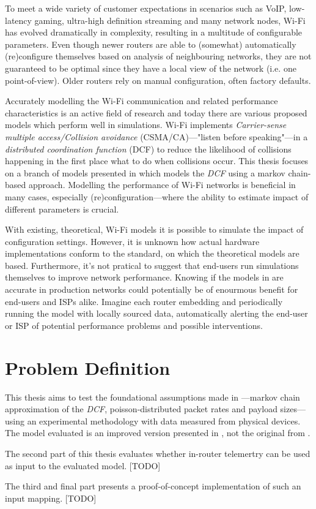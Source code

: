 To meet a wide variety of customer expectations in scenarios such as VoIP,
low-latency gaming, ultra-high definition streaming and many network nodes,
Wi-Fi has evolved dramatically in complexity, resulting in a multitude of
configurable parameters. Even though newer routers are able to (somewhat)
automatically (re)configure themselves based on analysis of neighbouring
networks, they are not guaranteed to be optimal since they have a local view
of the network (i.e. one point-of-view). Older routers rely on manual
configuration, often factory defaults. 

Accurately modelling the Wi-Fi communication and related performance
characteristics is an active field of research and today there are various
proposed models which perform well in simulations. Wi-Fi implements
\emph{Carrier-sense multiple access/Collision avoidance} (CSMA/CA)—"listen
before speaking"—in a \emph{distributed coordination function} (DCF) to reduce
the likelihood of collisions happening in the first place what to do when
collisions occur.  This thesis focuses on a branch of models presented in
\cite{bianchi} which models the \emph{DCF} using a markov chain-based
approach. Modelling the performance of Wi-Fi networks is beneficial in many
cases, especially (re)configuration—where the ability to estimate impact of
different parameters is crucial. 

With existing, theoretical, Wi-Fi models it is possible to simulate the impact
of configuration settings. However, it is unknown how actual hardware
implementations conform to the standard, on which the theoretical models are
based. Furthermore, it's not pratical to suggest that end-users run
simulations themselves to improve network performance. Knowing if the models
in \cite{felemban} are accurate in production networks could potentially be of
enourmous benefit for end-users and ISPs alike. Imagine each router embedding
and periodically running the model with locally sourced data, automatically
alerting the end-user or ISP of potential performance problems and possible
interventions.

\section{Problem Definition}

This thesis aims to test the foundational assumptions made in
\cite{bianchi}—markov chain approximation of the \emph{DCF},
poisson-distributed packet rates and payload sizes—using an experimental
methodology with data measured from physical devices. The model evaluated is
an improved version presented in \cite{felemban}, not the original from
\cite{bianchi}.

The second part of this thesis evaluates whether in-router telemertry can be
used as input to the evaluated model. [TODO]

The third and final part presents a proof-of-concept implementation of such an
input mapping. [TODO]
